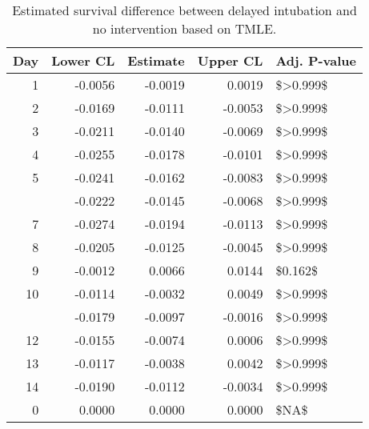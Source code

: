 \begin{table}

\caption{\label{tab:survdiff_tmle}Estimated survival difference between delayed intubation and no intervention based on TMLE.}
\centering
\begin{tabular}[t]{rrrrl}
\toprule
Day & Lower CL & Estimate & Upper CL & Adj. P-value\\
\midrule
1 & -0.0056 & -0.0019 & 0.0019 & \$>0.999\$\\
2 & -0.0169 & -0.0111 & -0.0053 & \$>0.999\$\\
3 & -0.0211 & -0.0140 & -0.0069 & \$>0.999\$\\
4 & -0.0255 & -0.0178 & -0.0101 & \$>0.999\$\\
5 & -0.0241 & -0.0162 & -0.0083 & \$>0.999\$\\
\addlinespace
6 & -0.0222 & -0.0145 & -0.0068 & \$>0.999\$\\
7 & -0.0274 & -0.0194 & -0.0113 & \$>0.999\$\\
8 & -0.0205 & -0.0125 & -0.0045 & \$>0.999\$\\
9 & -0.0012 & 0.0066 & 0.0144 & \$0.162\$\\
10 & -0.0114 & -0.0032 & 0.0049 & \$>0.999\$\\
\addlinespace
11 & -0.0179 & -0.0097 & -0.0016 & \$>0.999\$\\
12 & -0.0155 & -0.0074 & 0.0006 & \$>0.999\$\\
13 & -0.0117 & -0.0038 & 0.0042 & \$>0.999\$\\
14 & -0.0190 & -0.0112 & -0.0034 & \$>0.999\$\\
0 & 0.0000 & 0.0000 & 0.0000 & \$NA\$\\
\bottomrule
\end{tabular}
\end{table}
